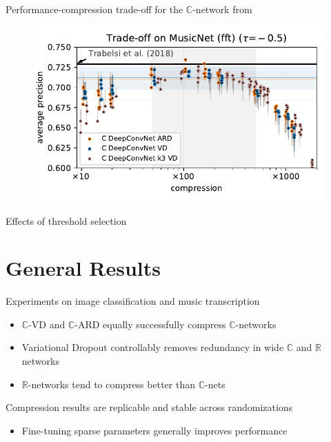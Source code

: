 \documentclass{beamer}
\newcommand{\real}{\mathbb{R}}
\newcommand{\cplx}{\mathbb{C}}
\begin{document}
\begin{frame}[c]{\insertsection}
Performance-compression trade-off for the $\cplx$-network from \cite{trabelsi_deep_2018}
  \begin{figure}[t]
    \centering
    \includegraphics[scale=0.55]{figure__musicnet__trade-off/paper__musicnetram__fft__-0.5.pdf}
  \end{figure}

\end{frame}

\begin{frame}[c]{\insertsection}
  Effects of threshold selection
\end{frame}


\section{General Results} %
\label{sec:general_results}

\begin{frame}[c]{\insertsection}
Experiments on image classification and music transcription
\begin{itemize}
  \item $\cplx$-VD and $\cplx$-ARD equally successfully compress $\cplx$-networks
  \smallskip
  \item Variational Dropout controllably removes redundancy in wide $\cplx$ and $\real$ networks
  \smallskip
  \item $\real$-networks tend to compress better than $\cplx$-nets
\end{itemize}

\bigskip
Compression results are replicable and stable across randomizations
\begin{itemize}
  \item Fine-tuning sparse parameters generally improves performance
\end{itemize}
\end{frame}
\end{document}
